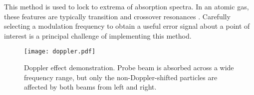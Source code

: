 This method is used to lock to extrema of absorption spectra.  In an atomic gas, these features are typically transition and crossover resonances \cite{maguire2006}. Carefully selecting a modulation frequency to obtain a useful error signal about a point of interest is a principal challenge of implementing this method.

\begin{figure}
    \centering
    \texttt{[image: doppler.pdf]}
    \caption{Doppler effect demonstration.  Probe beam is absorbed across a wide frequency range, but only the non-Doppler-shifted particles are affected by both beams from left and right.}
    \label{fig:doppler}
\end{figure}

